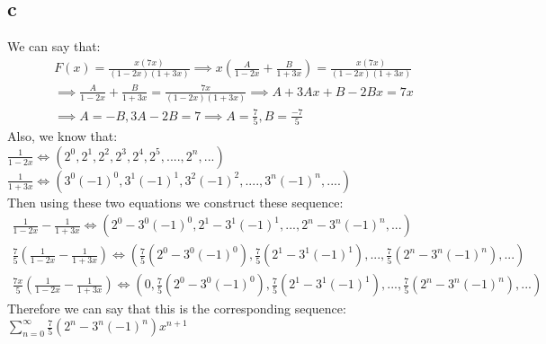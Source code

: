 \documentclass[12pt]{article}
\begin{document}
\subsection*{c}
We can say that:
\begin{equation} 
\begin{split}
    F(x) = \frac{x(7x)}{(1-2x)(1+3x)} \implies x(\frac{A}{1-2x} + \frac{B}{1+3x})=\frac{x(7x)}{(1-2x)(1+3x)} \\
    \implies \frac{A}{1-2x}+\frac{B}{1+3x} = \frac{7x}{(1-2x)(1+3x)}\implies A+3Ax+B-2Bx=7x \\ 
    \implies A=-B, 3A-2B=7 \implies A=\frac{7}{5}, B= \frac{-7}{5}
\end{split}    
\end{equation}
Also, we know that: \\
$\frac{1}{1-2x} \iff (2^0,2^1,2^2,2^3,2^4,2^5,....,2^n,...)$ \\
$\frac{1}{1+3x} \iff (3^0(-1)^0,3^1(-1)^1,3^2(-1)^2,....,3^n(-1)^n,....)$ \\
Then using these two equations we construct these sequence:
\begin{equation} 
\begin{split}
   \frac{1}{1-2x} - \frac{1}{1+3x} \iff (2^0-3^0(-1)^0,2^1-3^1(-1)^1,...,2^n-3^n(-1)^n,...) \\
   \frac{7}{5}(\frac{1}{1-2x} - \frac{1}{1+3x}) \iff (\frac{7}{5}(2^0-3^0(-1)^0),\frac{7}{5}(2^1-3^1(-1)^1),...,\frac{7}{5}(2^n-3^n(-1)^n),...) \\
    \frac{7x}{5}(\frac{1}{1-2x} - \frac{1}{1+3x}) \iff (0,\frac{7}{5}(2^0-3^0(-1)^0),\frac{7}{5}(2^1-3^1(-1)^1),...,\frac{7}{5}(2^n-3^n(-1)^n),...) 
\end{split}    
\end{equation}
Therefore we can say that this is the corresponding sequence: $\sum_{n=0}^{\infty}\frac{7}{5}(2^n-3^n(-1)^n)x^{n+1}$
\end{document}

